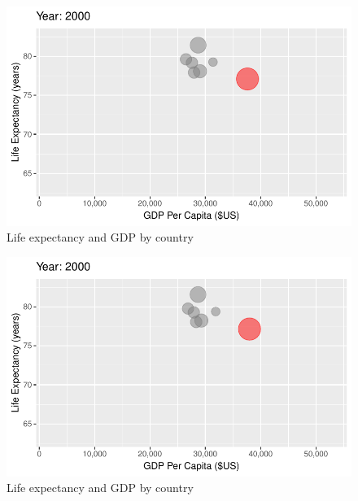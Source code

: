 \documentclass[
  letterpaper,
  DIV=11,
  numbers=noendperiod]{scrreport}
\theoremstyle{definition}
\theoremstyle{remark}
\begin{document}
\begin{figure}

{\centering \includegraphics{index_files/figure-pdf/fig-anim-country-87.pdf}

}

\caption{\label{fig-anim-country-87}Life expectancy and GDP by country}

\end{figure}

\begin{figure}

{\centering \includegraphics{index_files/figure-pdf/fig-anim-country-88.pdf}

}

\caption{\label{fig-anim-country-88}Life expectancy and GDP by country}

\end{figure}
\end{document}
